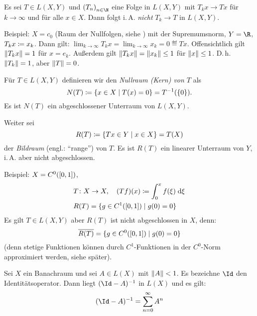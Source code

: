 \begin{thBemerkung}
    Es sei $T\in L(X,Y)$ und $\nSeq T$ eine Folge in $L(X,Y)$ mit $T_k x\to Tx$
    für $k\to\infty$ und für alle $x\in X$. Dann folgt i.\,A. \emph{nicht}
    $T_k\to T$ in $L(X,Y)$.
    
    Beispiel: $X=c_0$ 
    (Raum der Nullfolgen, 
    siehe )
    mit der Supremumsnorm, $Y=\R$, $T_kx\coloneqq x_k$.
    Dann gilt: $\lim_{k\to\infty} T_kx = \lim_{k\to\infty} x_k = 0 \eqdef Tx$.
    Offensichtlich gilt $\lVert T_kx\rVert=1$ für $x=e_k$.
    Außerdem gilt $\lVert T_kx\rVert = \lVert x_k\rVert \leq 1$ für $\lVert x\rVert\leq 1$. D.\,h.
    $\lVert T_k\rVert=1$, aber $\lVert T\rVert=0$.
\end{thBemerkung}

\begin{thDef} \label{vl04:def:nullundbildraum}
    Für $T\in L(X,Y)$ definieren wir den \emph{Nullraum (Kern) von $T$} als
    \[ N(T) \defeq \{ x\in X \Mid T(x) = 0 \}
        = T^{-1}(\{0\})
    . \]
    Es ist $N(T)$ ein abgeschlossener Unterraum von $L(X,Y)$.
    
    Weiter sei
    \[ R(T) \defeq \{ Tx\in Y \Mid x\in X \} = T(X) \]
    der \emph{Bildraum} (engl.: \enquote{range}) von $T$.
    Es ist $R(T)$ ein linearer Unterraum von $Y$, i.\,A. aber nicht
    abgeschlossen.
    
    Beispiel: $X=C^0([0,1])$,
    \begin{align*}
        &T\colon X\to X, \quad (Tf)(x) \defeq \int_0^x f(\xi) \dif{\xi}
        \\
        &R(T) = \{ g\in C^1(\I) \Mid g(0) = 0 \}
    \end{align*}
    Es gilt $T \in L(X,Y)$ aber $R(T)$ ist nicht abgeschlossen in $X$, denn:
    \[ \setclosure{R(T)} = \{ g\in C^0(\I) \Mid g(0) = 0 \}  \]
    (denn stetige Funktionen können durch $C^1$-Funktionen in der $C^0$-Norm
    approximiert werden, siehe später). %
\end{thDef}

\begin{thSatz} \label{vl04:neumannreihe}
    Sei $X$ ein Banachraum und sei $A\in L(X)$ mit $\lVert A\rVert<1$.
    Es bezeichne $\Id$ den Identitätsoperator.
    Dann liegt $(\Id-A)^{-1}$ in $L(X)$ und es gilt:
    \[ (\Id-A)^{-1} = \nsum[0]^\infty A^n \]
\end{thSatz}

